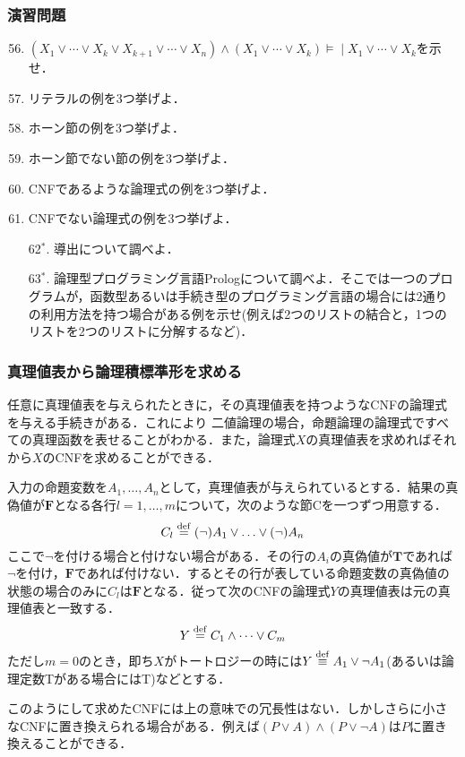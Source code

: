 \documentclass{ltjsarticle}
\theoremstyle{mystyle1}
\theoremstyle{mystyle3}
\theoremstyle{mystyle2}
\newcommand{\bT}{\ensuremath{\mathbf{T}}}
\newcommand{\bF}{\ensuremath{\mathbf{F}}}
\newcommand{\dequal}{\ensuremath{\stackrel{\rm{def}}{=}}}
\newcommand{\dequiv}{\ensuremath{\stackrel{\rm{def}}{\equiv}}}
\newcommand{\lequiv}{\ensuremath{\models\!\mid}}
\newcommand{\red}[1]{{\color{red} #1}}
\begin{document}
\subsubsection*{演習問題}
\begin{enumerate}
  \setcounter{enumi}{55}
  \item $(X_1\vee\cdots\vee X_k\vee X_{k+1} \vee\cdots\vee X_n)\wedge(X_1\vee\cdots\vee X_k)\lequiv X_1\vee\cdots\vee X_k$を示せ．
  \item リテラルの例を3つ挙げよ．
  \item ホーン節の例を3つ挙げよ．
  \item ホーン節でない節の例を3つ挙げよ．
  \item CNFであるような論理式の例を3つ挙げよ．
  \item CNFでない論理式の例を3つ挙げよ．
  \item[62$^\ast$.] 導出について調べよ．
  \item[63$^\ast$.] 論理型プログラミング言語Prologについて調べよ．そこでは一つのプログラムが，函数型あるいは手続き型のプログラミング言語の場合には2通りの利用方法を持つ場合がある例を示せ(例えば2つのリストの結合と，1つのリストを2つのリストに分解するなど)．
\end{enumerate}
\subsubsection{真理値表から論理積標準形を求める}
任意に真理値表を与えられたときに，その真理値表を持つようなCNFの論理式を与える手続きがある．これにより\red{二値論理の場合，命題論理の論理式ですべての真理函数を表せる}ことがわかる．また，論理式$X$の真理値表を求めればそれから$X$のCNFを求めることができる．

入力の命題変数を$A_1,\ldots,A_n$として，真理値表が与えられているとする．結果の真偽値が$\bF$となる各行$l = 1, \ldots, m$について，次のような節Cを一つずつ用意する．
\[C_l\dequal (\neg)A_1\vee\ldots\vee(\neg)A_n\]
ここで$\neg$を付ける場合と付けない場合がある．その行の$A_i$の真偽値が$\bT$であれば$\neg$を付け，$\bF$であれば付けない．するとその行が表している命題変数の真偽値の状態の場合のみに$C_l$は$\bF$となる．従って次のCNFの論理式$Y$の真理値表は元の真理値表と一致する．
\[Y \dequal C_1\wedge\cdots\vee C_m\]
ただし$m=0$のとき，即ち$X$がトートロジーの時には$Y\dequiv A_1\vee\neg A_1$(あるいは論理定数Tがある場合にはT)などとする．

このようにして求めたCNFには上の意味での冗長性はない．しかしさらに小さなCNFに置き換えられる場合がある．例えば$(P\vee A)\wedge(P\vee\neg A)$は$P$に置き換えることができる．
\end{document}
